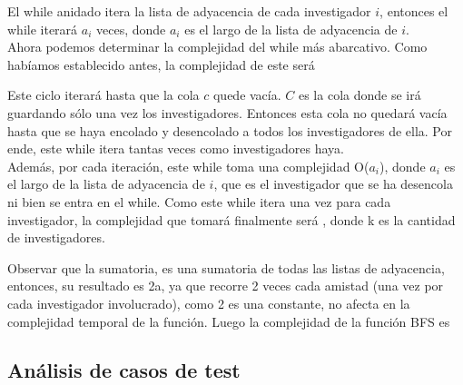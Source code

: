 \indent El while anidado itera la lista de adyacencia de cada investigador $i$, entonces
el while iterará $a_i$ veces, donde $a_i$ es el largo
de la lista de adyacencia de $i$.\\

\indent Ahora podemos determinar la complejidad del while más abarcativo. Como habíamos
establecido antes, la complejidad de este será 

\indent Este ciclo iterará hasta que la cola $c$ quede vacía. $C$ es la cola donde se irá guardando
sólo una vez los investigadores. Entonces esta cola no quedará vacía hasta que se haya encolado y desencolado 
a todos los investigadores de ella. Por ende, este while itera tantas veces como investigadores haya.\\

\indent Además, por cada iteración, este while toma una complejidad O($a_i$), donde $a_i$ es el largo
de la lista de adyacencia de $i$, que es el
investigador que se ha desencola ni bien se entra en el while. Como este while itera una vez para cada investigador,
la complejidad que tomará finalmente será 
, donde k es la cantidad de investigadores.

\indent Observar que la sumatoria, es una sumatoria de todas las listas de adyacencia, entonces, su resultado es 2a,
ya que recorre 2 veces cada amistad (una vez por cada investigador involucrado), como 2 es una constante, no afecta
en la complejidad temporal de la función. 
Luego la complejidad de la función BFS es 

\subsection{Análisis de casos de test}
